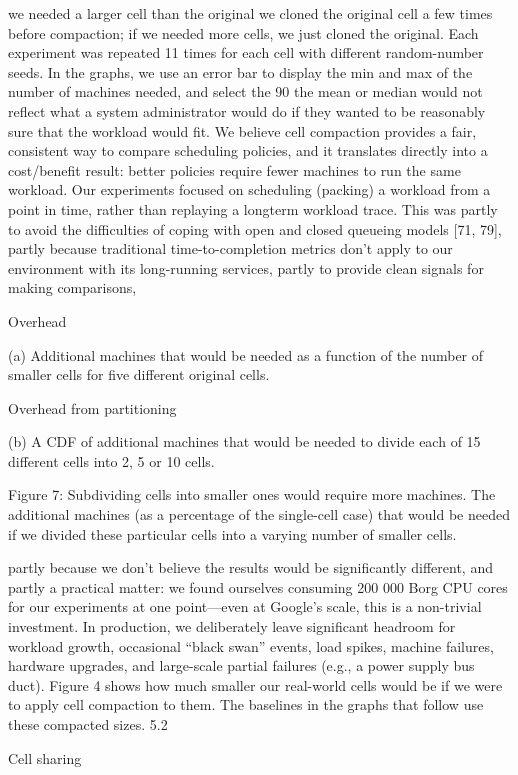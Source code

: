 we needed a larger cell than the original we cloned the original cell a few times before compaction; if we needed more
cells, we just cloned the original.
Each experiment was repeated 11 times for each cell with
different random-number seeds. In the graphs, we use an error bar to display the min and max of the number of machines needed, and select the 90%
the mean or median would not reflect what a system administrator would do if they wanted to be reasonably sure that
the workload would fit. We believe cell compaction provides
a fair, consistent way to compare scheduling policies, and it
translates directly into a cost/benefit result: better policies
require fewer machines to run the same workload.
Our experiments focused on scheduling (packing) a
workload from a point in time, rather than replaying a longterm workload trace. This was partly to avoid the difficulties
of coping with open and closed queueing models [71, 79],
partly because traditional time-to-completion metrics don’t
apply to our environment with its long-running services,
partly to provide clean signals for making comparisons,


Overhead 

(a) Additional machines that would be needed as a function of
the number of smaller cells for five different original cells.

Overhead from partitioning

(b) A CDF of additional machines that would be needed to
divide each of 15 different cells into 2, 5 or 10 cells.

Figure 7: Subdividing cells into smaller ones would require more machines. The additional machines (as a percentage of the single-cell
case) that would be needed if we divided these particular cells into a varying number of smaller cells.

partly because we don’t believe the results would be significantly different, and partly a practical matter: we found
ourselves consuming 200 000 Borg CPU cores for our experiments at one point—even at Google’s scale, this is a
non-trivial investment.
In production, we deliberately leave significant headroom
for workload growth, occasional “black swan” events, load
spikes, machine failures, hardware upgrades, and large-scale
partial failures (e.g., a power supply bus duct). Figure 4
shows how much smaller our real-world cells would be if
we were to apply cell compaction to them. The baselines in
the graphs that follow use these compacted sizes.
5.2

Cell sharing

